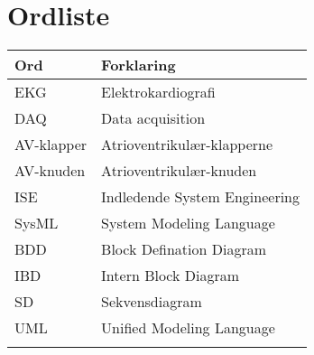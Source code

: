 \chapter{Ordliste}

\begin{longtabu} to 
    Ord &    Forklaring\\
    \toprule 
	EKG	&	Elektrokardiografi\\
	DAQ	&	Data acquisition\\
	AV-klapper	&	Atrioventrikulær-klapperne\\
	AV-knuden	&	Atrioventrikulær-knuden\\
	ISE & Indledende System Engineering \\
	SysML & System Modeling Language \\
	BDD & Block Defination Diagram \\
	IBD & Intern Block Diagram\\
	SD & Sekvensdiagram\\
	UML & Unified Modeling Language\\
\label{forkort}
\end{longtabu}
